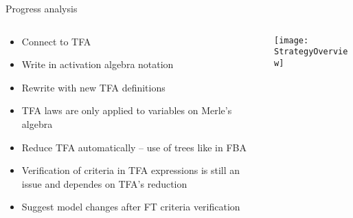 \begin{frame}[fragile]{Progress analysis}
  \begin{columns}
    \begin{column}{0.45\paperwidth}
        \begin{itemize}
          \item<1-> Connect to TFA
          \item<2-> Write in activation algebra notation
          \item<3-> Rewrite with new TFA definitions
          \item<4-> TFA laws are only applied to variables on Merle's algebra
          \item<5-> Reduce TFA automatically -- use of trees like in FBA
          \item<6-> Verification of criteria in TFA expressions is still an issue and dependes on TFA's reduction
          \item<7-> Suggest model changes after FT criteria verification
        \end{itemize}
    \end{column}
    \begin{column}{0.45\paperwidth}
        \texttt{[image: StrategyOverview]}
    \end{column}
\end{columns}


\end{frame}

